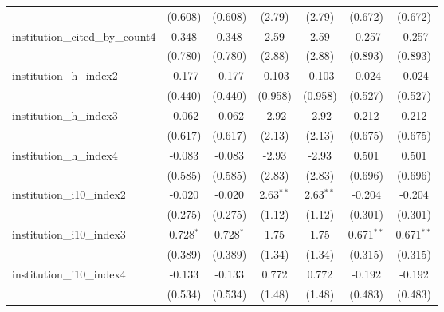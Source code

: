 \begin{tabular}{lcccccc}
                                         & (0.608)        & (0.608)        & (2.79)        & (2.79)        & (0.672)       & (0.672)\\   
   institution\_cited\_by\_count4        & 0.348          & 0.348          & 2.59          & 2.59          & -0.257        & -0.257\\   
                                         & (0.780)        & (0.780)        & (2.88)        & (2.88)        & (0.893)       & (0.893)\\   
   institution\_h\_index2                & -0.177         & -0.177         & -0.103        & -0.103        & -0.024        & -0.024\\   
                                         & (0.440)        & (0.440)        & (0.958)       & (0.958)       & (0.527)       & (0.527)\\   
   institution\_h\_index3                & -0.062         & -0.062         & -2.92         & -2.92         & 0.212         & 0.212\\   
                                         & (0.617)        & (0.617)        & (2.13)        & (2.13)        & (0.675)       & (0.675)\\   
   institution\_h\_index4                & -0.083         & -0.083         & -2.93         & -2.93         & 0.501         & 0.501\\   
                                         & (0.585)        & (0.585)        & (2.83)        & (2.83)        & (0.696)       & (0.696)\\   
   institution\_i10\_index2              & -0.020         & -0.020         & 2.63$^{**}$   & 2.63$^{**}$   & -0.204        & -0.204\\   
                                         & (0.275)        & (0.275)        & (1.12)        & (1.12)        & (0.301)       & (0.301)\\   
   institution\_i10\_index3              & 0.728$^{*}$    & 0.728$^{*}$    & 1.75          & 1.75          & 0.671$^{**}$  & 0.671$^{**}$\\   
                                         & (0.389)        & (0.389)        & (1.34)        & (1.34)        & (0.315)       & (0.315)\\   
   institution\_i10\_index4              & -0.133         & -0.133         & 0.772         & 0.772         & -0.192        & -0.192\\   
                                         & (0.534)        & (0.534)        & (1.48)        & (1.48)        & (0.483)       & (0.483)\\   

\end{tabular}
